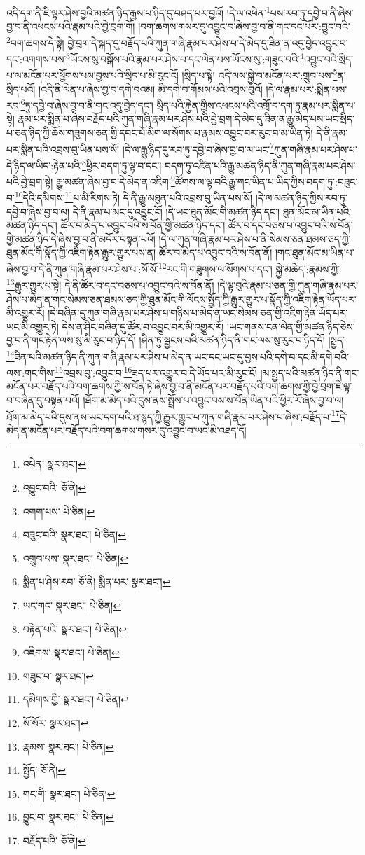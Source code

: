 འདི་དག་ནི་ཇི་ལྟར་ཤེས་བྱའི་མཚན་ཉིད་རྒྱས་པ་ཉིད་དུ་བཤད་པར་བྱའོ། །དེ་ལ་འཕེན་\footnote{འཔེན་  སྣར་ཐང་། }པས་རབ་ཏུ་དབྱེ་བ་ནི་ཞེས་བྱ་བ་ནི་འཕངས་པའི་རྣམ་པའི་བྱེ་བྲག་གོ། །བག་ཆགས་གསར་དུ་འབྱུང་བ་ཞེས་བྱ་བ་ནི་གང་དང་པོར་:བྱུང་བའི་\footnote{འབྱུང་བའི་  ཅོ་ནེ། }བག་ཆགས་དེ་སྟེ། བྱེ་བྲག་དེ་སྐད་དུ་བརྗོད་པའི་ཀུན་གཞི་རྣམ་པར་ཤེས་པ་དེ་མེད་དུ་ཟིན་ན་འདུ་བྱེད་འབྱུང་བ་དང་:འགགས་པས་\footnote{འགག་པས་  པེ་ཅིན། }ཡོངས་སུ་བསྒོས་པའི་རྣམ་པར་ཤེས་པ་དང་ལེན་པས་ཡོངས་སུ་:གཟུང་བའི་\footnote{བཟུང་བའི་  སྣར་ཐང་།  པེ་ཅིན། }འབྱུང་བའི་སྲིད་པ་ལ་མངོན་པར་ཕྱོགས་པས་བྱས་པའི་སྲིད་པ་མི་རུང་ངོ། །སྲིད་པ་སྟེ། འདི་ལས་སྐྱེ་བ་མངོན་པར་:གྲུབ་པས་\footnote{འགྲུབ་པས་  སྣར་ཐང་།  པེ་ཅིན། }ན་སྲིད་པའོ། །འདི་ནི་ལེན་པ་ཞེས་བྱ་བ་དགེ་བའམ། མི་དགེ་བ་གོམས་པའི་འབྲས་བུའོ། །དེ་ལ་རྣམ་པར་:སྨིན་པས་རབ་\footnote{སྨིན་པ་ཤེས་རབ་  ཅོ་ནེ། སྨིན་པར་  སྣར་ཐང་། }ཏུ་དབྱེ་བ་ཞེས་བྱ་བ་ནི་གང་འདུ་བྱེད་དང་། སྲིད་པའི་རྐྱེན་གྱིས་འཕངས་པའི་འགྲོ་བ་དག་ཏུ་རྣམ་པར་སྨིན་པ་སྟེ། རྣམ་པར་སྨིན་པ་ཞེས་བརྗོད་པའི་ཀུན་གཞི་རྣམ་པར་ཤེས་པའི་བྱེ་བྲག་དེ་མེད་དུ་ཟིན་ན་རྒྱུ་མེད་པས་ཡང་སྲིད་པ་ཅན་ཉིད་ཀྱི་ཆོས་གཟུགས་ཅན་གྱི་དབང་པོ་མིག་ལ་སོགས་པ་རྣམས་འབྱུང་བར་རུང་བ་མ་ཡིན་ཏེ། དེ་ནི་རྣམ་པར་སྨིན་པའི་འབྲས་བུ་ཡིན་པས་སོ། །དེ་ལ་རྒྱུ་ཉིད་དུ་རབ་ཏུ་དབྱེ་བ་ཞེས་བྱ་བ་ལ་ཡང་\footnote{ཡང་གང་  སྣར་ཐང་།  པེ་ཅིན། }ཀུན་གཞི་རྣམ་པར་ཤེས་པ་དེ་ཉིད་ལ་ཡིད་:རྟེན་པའི་\footnote{བརྟེན་པའི་  སྣར་ཐང་།  པེ་ཅིན། }ཕྱིར་བདག་ཏུ་ལྟ་བ་དང་། བདག་ཏུ་འཛིན་པའི་རྒྱུ་མཚན་ཉིད་ནི་ཀུན་གཞི་རྣམ་པར་ཤེས་པའི་བྱེ་བྲག་སྟེ། རྒྱུ་མཚན་ཞེས་བྱ་བ་དེ་མེད་ན་འཇིག་\footnote{འཇིགས་  སྣར་ཐང་།  པེ་ཅིན། }ཚོགས་ལ་ལྟ་བའི་རྒྱུ་གང་ཡིན་པ་ཡིད་ཀྱིས་བདག་ཏུ་:བཟུང་བ་\footnote{གཟུང་བ་  སྣར་ཐང་། }དེའི་དམིགས་\footnote{དམིགས་གྱི་  སྣར་ཐང་།  པེ་ཅིན། }པ་མི་རིགས་ཏེ། དེ་ནི་རྒྱུ་མཐུན་པའི་འབྲས་བུ་ཡིན་པས་སོ། །དེ་ལ་མཚན་ཉིད་ཀྱིས་རབ་ཏུ་དབྱེ་བ་ཞེས་བྱ་བ་ལ། དེ་ནི་རྣམ་པ་མང་དུ་འབྱུང་ངོ། །དེ་ཡང་ཐུན་མོང་གི་མཚན་ཉིད་དང་། ཐུན་མོང་མ་ཡིན་པའི་མཚན་ཉིད་དང་། ཚོར་བ་མེད་པ་འབྱུང་བའི་ས་བོན་གྱི་མཚན་ཉིད་དང་། ཚོར་བ་དང་བཅས་པ་འབྱུང་བའི་ས་བོན་གྱི་མཚན་ཉིད་དེ་ཞེས་བྱ་བ་ནི་མདོར་བསྟན་པའོ། །དེ་ལ་ཀུན་གཞི་རྣམ་པར་ཤེས་པ་ནི་སེམས་ཅན་ཐམས་ཅད་ཀྱི་ཐུན་མོང་གི་སྣོད་ཀྱི་འཇིག་རྟེན་རྒྱུར་གྱུར་པས་ན། ཚོར་བ་མེད་པ་འབྱུང་བའི་ས་བོན་ནོ། །གང་ཐུན་མོང་མ་ཡིན་པ་ཞེས་བྱ་བ་དེ་ནི་ཀུན་གཞི་རྣམ་པར་ཤེས་པ་:སོ་སོ་\footnote{སོ་སོར་  སྣར་ཐང་། }རང་གི་གཟུགས་ལ་སོགས་པ་དང་། སྐྱེ་མཆེད་:རྣམས་ཀྱི་\footnote{རྣམས་  སྣར་ཐང་།  པེ་ཅིན། }རྒྱུར་གྱུར་པ་སྟེ། དེ་ནི་ཚོར་བ་དང་བཅས་པ་འབྱུང་བའི་ས་བོན་ནོ། །དེ་ལྟ་བུའི་རྣམ་པ་ཅན་གྱི་ཀུན་གཞི་རྣམ་པར་ཤེས་པ་མེད་ན་གང་སེམས་ཅན་ཐམས་ཅད་ཀྱི་ཐུན་མོང་གི་ལོངས་སྤྱོད་ཀྱི་རྒྱུར་གྱུར་པ་སྣོད་ཀྱི་འཇིག་རྟེན་ཡོད་པར་མི་འགྱུར་རོ། །དེ་བཞིན་དུ་ཀུན་གཞི་རྣམ་པར་ཤེས་པ་གཉིས་པ་མེད་ན་ཡང་སེམས་ཅན་གྱི་འཇིག་རྟེན་ཡོད་པར་ཡང་མི་འགྱུར་ཏེ། དེས་ན་ཤིང་བཞིན་དུ་ཚོར་བ་འབྱུང་བར་མི་འགྱུར་རོ། །ཡང་གནས་ངན་ལེན་གྱི་མཚན་ཉིད་ཅེས་བྱ་བ་ནི་གང་རྟེན་ལས་སུ་མི་རུང་བ་ཉིད་དོ། །ཤིན་ཏུ་སྦྱངས་པའི་མཚན་ཉིད་ནི་གང་ལས་སུ་རུང་བ་ཉིད་དོ། །སྤྱད་\footnote{སྤྱོད་  ཅོ་ནེ། }ཟིན་པའི་མཚན་ཉིད་ནི་ཀུན་གཞི་རྣམ་པར་ཤེས་པ་མེད་ན་ཡང་དང་ཡང་དུ་བྱས་པའི་དགེ་བ་དང་མི་དགེ་བའི་ལས་:གང་གིས་\footnote{གང་གི་  སྣར་ཐང་།  པེ་ཅིན། }འབྲས་བུ་:འབྱུང་བ་\footnote{བྱུང་བ་  སྣར་ཐང་།  པེ་ཅིན། }ཟད་པར་འགྱུར་བ་དེ་ཡོད་པར་མི་རུང་ངོ། །མ་སྤྱད་པའི་མཚན་ཉིད་ནི་གང་མངོན་པར་བརྗོད་པའི་བག་ཆགས་ཀྱི་ས་བོན་ཏེ་ཞེས་བྱ་བ་ནི་མངོན་པར་བརྗོད་པའི་བག་ཆགས་ཀྱི་བྱེ་བྲག་ཇི་ལྟ་བ་བཞིན་དུ་བསྟན་པའོ། །ཐོག་མ་མེད་པའི་དུས་ནས་སྤྲོས་པ་འབྱུང་བས་ས་བོན་ཡིན་པའི་ཕྱིར་རོ་ཞེས་བྱ་བ་ལ། ཐོག་མ་མེད་པའི་དུས་ནས་ཡང་དག་པའི་ཐ་སྙད་ཀྱི་རྒྱུར་གྱུར་པ་ཀུན་གཞི་རྣམ་པར་ཤེས་པ་ཞེས་:བརྗོད་པ་\footnote{བརྗོད་པའི་  ཅོ་ནེ། }དེ་མེད་ན་མངོན་པར་བརྗོད་པའི་བག་ཆགས་གསར་དུ་འབྱུང་བ་ཡང་མི་འཐད་དོ། 